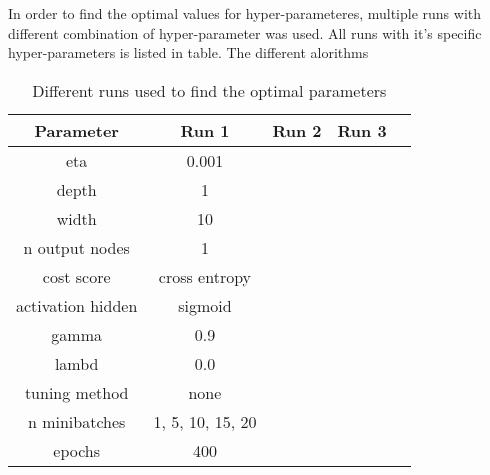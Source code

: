 In order to find the optimal values for hyper-parameteres, multiple runs with
different combination of hyper-parameter was used. All runs with it's specific
hyper-parameters is listed in table. The different alorithms %


\begin{table}[H]
    \centering
    \caption{Different runs used to find the optimal parameters}  
    \label{tab:runs_classification_cancer} 
    \begin{tabular}{|c|c|c|c|c|}
        \hline

        Parameter & Run 1 & Run 2 & Run 3 \\
        \hline
        eta & 0.001 &  \\
        \hline
        depth & 1   \\
        \hline
        width & 10  \\
        \hline
        n output nodes & 1 \\
        \hline
        cost score & cross entropy \\
        \hline
        activation hidden & sigmoid \\
        \hline
        gamma & 0.9 \\
        \hline
        lambd & 0.0 \\
        \hline
        tuning method & none \\
        \hline
        n minibatches & 1, 5, 10, 15, 20 \\
        \hline
        epochs & 400  \\
        \hline
         
    \end{tabular} 
\end{table}






% 
